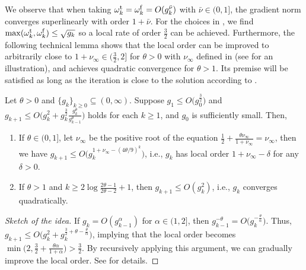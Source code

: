 We observe that when taking $\omega_k^{\mathrm{t}} = \omega_k^{\mathrm{f}} = O(g_k^{\bar\nu})$ with $\bar \nu \in (0, 1]$, the gradient norm converges superlinearly with order $1 + \bar\nu$.
For the choices in , we find $\max(\omega_k^{\mathrm{t}},\omega_k^{\mathrm{f}}) \leq \sqrt{g_k}$ so a local rate of order $\frac{3}{2}$ can be achieved.
Furthermore, the following technical lemma shows that the local order can be improved to arbitrarily close to $1 + \nu_\infty \in \big(\frac{3}{2}, 2\big]$ for $\theta > 0$ with $\nu_\infty$ defined in  (see  for an illustration), and achieves quadratic convergence for $\theta > 1$.
Its premise will be satisfied as long as the iteration is close to the solution according to .

\begin{lemma}
    \label{lem:superlinear-rate-boosting}
    Let $\theta > 0$ and $\{ g_k  \}_{k \geq 0} \subseteq (0, \infty)$. 
    Suppose $g_1 \leq O \big( g_0^{\frac{3}{2}} \big)$ and
    $g_{k+1} \leq O \big (g_k^{2} + g_k^{\frac{3}{2}} \frac{g_k^\theta}{g_{k-1}^\theta} \big )$ holds for each $k \geq 1$,
    and $g_0$ is sufficiently small. 
    Then, 
    \begin{enumerate}
        \item If $\theta \in (0, 1]$, let $\nu_\infty$ be the positive root of the equation $\frac{1}{2} + \frac{\theta \nu_\infty}{1 + \nu_\infty} = \nu_\infty$, 
        then we have $g_{k + 1} \leq O\big ( g_k^{1 + \nu_\infty - (4\theta/9)^{k}}  \big )$,
        i.e., $g_k$ has local order $1 + \nu_\infty - \delta$ for any $\delta > 0$.
        \item If $\theta > 1$ and $k \geq2\log \frac{2\theta - 1}{2\theta - 2} + 1$, 
        then $g_{k+1} \leq O(g_k^2)$,
        i.e., $g_k$ converges quadratically.
    \end{enumerate}
\end{lemma}
\begin{proof}[Sketch of the idea]
    If $g_{k} = O(g_{k-1}^{\alpha})$ for $\alpha \in (1, 2]$, 
    then $g_{k-1}^{-\theta} = O\big (g_k^{-\frac{\theta}{\alpha}}\big )$.
    Thus, $g_{k+1} \leq O\big (g_k^2 + g_k^{\frac{3}{2} + \theta - \frac{\theta}{\alpha}}\big )$, 
    implying that the local order becomes $\min\big (2, \frac{3}{2} + \frac{\theta\alpha}{1 + \alpha} \big) > \frac{3}{2}$.
    By recursively applying this argument, we can gradually improve the local order.
    See  for details.
\end{proof}



